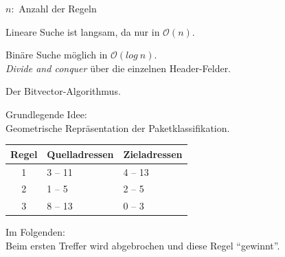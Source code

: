 \documentclass[xcolor=x11names,compress]{beamer}
\renewcommand{\(}{\begin{columns}}
\renewcommand{\)}{\end{columns}}
\newcommand{\<}[1]{\begin{column}{#1}}
\renewcommand{\>}{\end{column}}
\begin{document}
\begin{frame}
  $n:$ Anzahl der Regeln
  \begin{tcolorbox}[colback=red!5!white,colframe=red!75!black,title=Problem,drop fuzzy shadow]
  Lineare Suche ist langsam, da nur in $\mathcal O(n)$.
  \end{tcolorbox}
  \pause
  \begin{tcolorbox}[colback=teal!5!white,colframe=teal!75!black,title=Grundidee,drop fuzzy shadow]
  Binäre Suche möglich in $\mathcal O(log\ n)$.\\
  \textit{Divide and conquer} über die einzelnen Header-Felder.
  \end{tcolorbox}
  \pause
  \begin{tcolorbox}[colback=blue!5!white,colframe=blue!75!black,title=Mögliche Lösung,drop fuzzy shadow]
  Der Bitvector-Algorithmus.
  \end{tcolorbox}
\end{frame}

\begin{frame}
  Grundlegende Idee:\\
  Geometrische Repräsentation der Paketklassifikation.
  \pause
  \begin{table}
  \centering
  \begin{tabularx}{0.7\textwidth}{c|X|X}
  Regel&Quelladressen&Zieladressen\\
  \hline
  1&3 -- 11&4 -- 13\\
  2&1 -- 5&2 -- 5\\
  3&8 -- 13&0 -- 3\\
  \end{tabularx}
  \end{table}
  Im Folgenden:\\
  Beim ersten Treffer wird abgebrochen und diese Regel \enquote{gewinnt}.
\end{frame}
\end{document}
